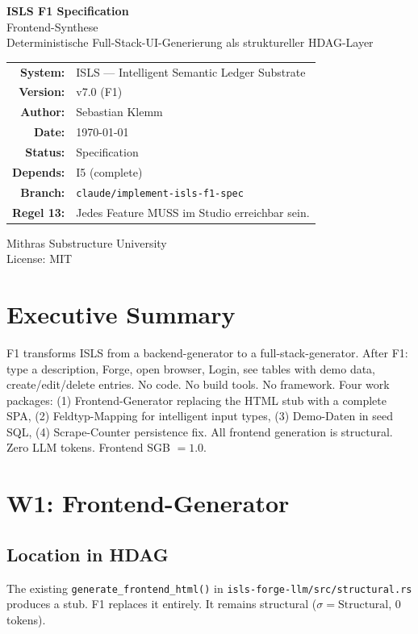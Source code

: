 \documentclass[11pt,a4paper]{article}
\begin{document}
\begin{titlepage}\centering\vspace*{2.5cm}
{\Huge\bfseries\color{isls-blue} ISLS F1 Specification}\\[0.5cm]
{\LARGE\color{isls-orange} Frontend-Synthese}\\[0.3cm]
{\large\color{isls-gray} Deterministische Full-Stack-UI-Generierung als struktureller HDAG-Layer}\\[2cm]
{\large\begin{tabular}{rl}
\textbf{System:} & ISLS --- Intelligent Semantic Ledger Substrate \\
\textbf{Version:} & v7.0 (F1) \\
\textbf{Author:} & Sebastian Klemm \\
\textbf{Date:} & \today \\
\textbf{Status:} & Specification \\
\textbf{Depends:} & I5 (complete) \\
\textbf{Branch:} & \texttt{claude/implement-isls-f1-spec} \\
\textbf{Regel 13:} & Jedes Feature MUSS im Studio erreichbar sein.
\end{tabular}}
\vfill{\small\color{isls-gray}Mithras Substructure University\\License: MIT}
\end{titlepage}
\tableofcontents\newpage

\section{Executive Summary}
F1 transforms ISLS from a backend-generator to a full-stack-generator. After F1: type a description, Forge, open browser, Login, see tables with demo data, create/edit/delete entries. No code. No build tools. No framework. Four work packages: (1) Frontend-Generator replacing the HTML stub with a complete SPA, (2) Feldtyp-Mapping for intelligent input types, (3) Demo-Daten in seed SQL, (4) Scrape-Counter persistence fix. All frontend generation is structural. Zero LLM tokens. Frontend SGB $= 1.0$.

\section{W1: Frontend-Generator}
\subsection{Location in HDAG}
The existing \texttt{generate\_frontend\_html()} in \texttt{isls-forge-llm/src/structural.rs} produces a stub. F1 replaces it entirely. It remains structural ($\sigma = \text{Structural}$, 0 tokens).
\end{document}
